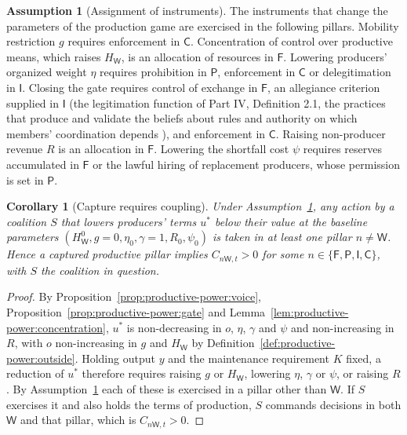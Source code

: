 \documentclass[11pt,letterpaper]{article}
\newtheorem{corollary}[theorem]{Corollary}
\theoremstyle{definition}
\newtheorem{assumption}[theorem]{Assumption}
\theoremstyle{remark}
\newcommand{\pF}{\mathsf{F}}
\newcommand{\pP}{\mathsf{P}}
\newcommand{\pI}{\mathsf{I}}
\newcommand{\pC}{\mathsf{C}}
\newcommand{\pW}{\mathsf{W}}
\newcommand{\HW}{H_{\pW}}
\begin{document}
\begin{assumption}[Assignment of instruments]
\label{ass:productive-power:instruments}
The instruments that change the parameters of the production game are exercised in the following pillars. Mobility restriction $g$ requires enforcement in $\pC$. Concentration of control over productive means, which raises $\HW$, is an allocation of resources in $\pF$. Lowering producers' organized weight $\eta$ requires prohibition in $\pP$, enforcement in $\pC$ or delegitimation in $\pI$. Closing the gate requires control of exchange in $\pF$, an allegiance criterion supplied in $\pI$ (the legitimation function of Part IV, Definition 2.1, the practices that produce and validate the beliefs about rules and authority on which members' coordination depends \citep{long2026ideological}), and enforcement in $\pC$. Raising non-producer revenue $R$ is an allocation in $\pF$. Lowering the shortfall cost $\psi$ requires reserves accumulated in $\pF$ or the lawful hiring of replacement producers, whose permission is set in $\pP$.
\end{assumption}

\begin{corollary}[Capture requires coupling]
\label{cor:productive-power:coupling}
Under Assumption~\ref{ass:productive-power:instruments}, any action by a coalition $S$ that lowers producers' terms $u^*$ below their value at the baseline parameters $(\HW^0,g=0,\eta_0,\gamma=1,R_0,\psi_0)$ is taken in at least one pillar $n\ne\pW$. Hence a captured productive pillar implies $C_{n\pW,t}>0$ for some $n\in\{\pF,\pP,\pI,\pC\}$, with $S$ the coalition in question.
\end{corollary}

\begin{proof}
By Proposition~\ref{prop:productive-power:voice}, Proposition~\ref{prop:productive-power:gate} and Lemma~\ref{lem:productive-power:concentration}, $u^*$ is non-decreasing in $o$, $\eta$, $\gamma$ and $\psi$ and non-increasing in $R$, with $o$ non-increasing in $g$ and $\HW$ by Definition~\ref{def:productive-power:outside}. Holding output $y$ and the maintenance requirement $K$ fixed, a reduction of $u^*$ therefore requires raising $g$ or $\HW$, lowering $\eta$, $\gamma$ or $\psi$, or raising $R$. By Assumption~\ref{ass:productive-power:instruments} each of these is exercised in a pillar other than $\pW$. If $S$ exercises it and also holds the terms of production, $S$ commands decisions in both $\pW$ and that pillar, which is $C_{n\pW,t}>0$.
\end{proof}
\end{document}
